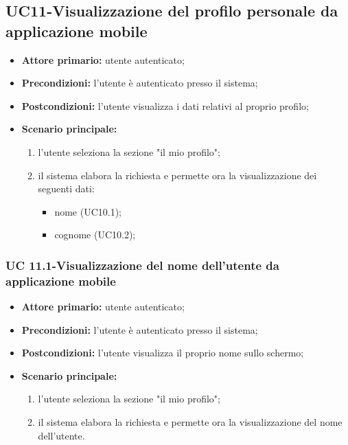 \subsection{UC11-Visualizzazione del profilo personale da applicazione mobile}
\begin{itemize}
	\item \textbf{Attore primario:} utente autenticato;

	\item \textbf{Precondizioni:} l'utente è autenticato presso il sistema;

	\item \textbf{Postcondizioni:} l'utente visualizza i dati relativi al proprio profilo;

	\item \textbf{Scenario principale:}
		\begin{enumerate}
   			 \item  l'utente seleziona la sezione "il mio profilo";
    		 \item  il sistema elabora la richiesta e permette ora la visualizzazione dei seguenti dati:
   			\begin{itemize}
     			\item nome (UC10.1);
         	    \item cognome (UC10.2);
   			\end{itemize}
	   	\end{enumerate}
\end{itemize}


\subsubsection{UC 11.1-Visualizzazione del nome dell'utente da applicazione mobile}
\begin{itemize}
	\item \textbf{Attore primario:} utente autenticato;

	\item \textbf{Precondizioni:} l'utente è autenticato presso il sistema;

	\item \textbf{Postcondizioni:} l'utente visualizza il proprio nome sullo schermo;

	\item \textbf{Scenario principale:}
		\begin{enumerate}
    		\item  l'utente seleziona la sezione "il mio profilo";
    		\item  il sistema elabora la richiesta e permette ora la visualizzazione del nome dell'utente.
		\end{enumerate}
\end{itemize}

